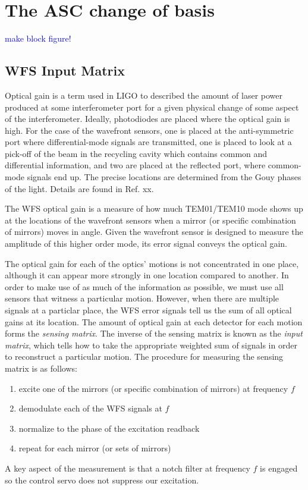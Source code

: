 \section{The ASC change of basis}
\textcolor{blue}{make block figure!}



\subsection{WFS Input Matrix}
Optical gain is a term used in LIGO to described the amount of laser
power produced at some interferometer port for a given physical change
of some aspect of the interferometer. Ideally, photodiodes are placed
where the optical gain is high. For the case of the wavefront sensors,
one is placed at the anti-symmetric port where differential-mode
signals are transmitted, one is placed to look at a pick-off of the
beam in the recycling cavity which contains common and differential
information, and two are placed at the reflected port, where
common-mode signals end up. The precise locations are determined from
the Gouy phases of the light. Details are found in Ref. xx.

The WFS optical gain is a measure of how much TEM01/TEM10 mode shows
up at the locations of the wavefront sensors when a mirror (or
specific combination of mirrors) moves in angle. Given the wavefront
sensor is designed to measure the amplitude of this higher order mode,
its error signal conveys the optical gain.

The optical gain for each of the optics' motions is not concentrated
in one place, although it can appear more strongly in one location
compared to another. In order to make use of as much of the
information as possible, we must use all sensors that witness a
particular motion. However, when there are multiple signals at a
particlar place, the WFS error signals tell us the sum of all optical
gains at its location. The amount of optical gain at each detector for
each motion forms the \emph{sensing matrix}. The inverse of the
sensing matrix is known as the \emph{input matrix}, which tells how to
take the appropriate weighted sum of signals in order to reconstruct a
particular motion. The procedure for measuring the sensing matrix is
as follows:
\begin{enumerate}
\item excite one of the mirrors (or specific combination of mirrors)
  at frequency $f$ \vspace{-10pt}
\item demodulate each of the WFS signals at $f$ \vspace{-10pt}
\item normalize to the phase of the excitation readback \vspace{-10pt}
\item repeat for each mirror (or sets of mirrors)
\end{enumerate}
A key aspect of the measurement is that a notch filter at frequency
$f$ is engaged so the control servo does not suppress our excitation.

